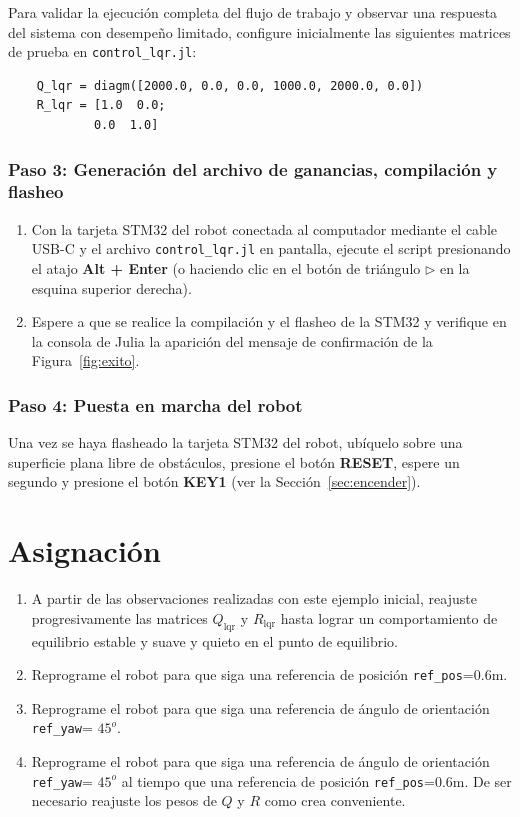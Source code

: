 Para validar la ejecución completa del flujo de trabajo y observar una respuesta del sistema con desempeño limitado, configure inicialmente las siguientes matrices de prueba en \texttt{control\_lqr.jl}:

\begin{verbatim}
	Q_lqr = diagm([2000.0, 0.0, 0.0, 1000.0, 2000.0, 0.0])
	R_lqr = [1.0  0.0;
			0.0  1.0]
\end{verbatim}

\subsubsection*{Paso 3: Generación del archivo de ganancias, compilación y flasheo}

\begin{enumerate}
	\item Con la tarjeta STM32 del robot conectada al computador mediante el cable USB-C y el archivo \texttt{control\_lqr.jl} en pantalla, ejecute el script presionando el atajo \textbf{Alt + Enter} (o haciendo clic en el botón de triángulo $\triangleright$ en la esquina superior derecha).
	\item Espere a que se realice la compilación y el flasheo de la STM32 y verifique en la consola de Julia la aparición del mensaje de confirmación de la Figura~\ref{fig:exito}.
\end{enumerate}

\subsubsection*{Paso 4: Puesta en marcha del robot}

Una vez se haya flasheado la tarjeta STM32 del robot, ubíquelo sobre una superficie plana libre de obstáculos, presione el botón \textbf{RESET}, espere un segundo y presione el botón \textbf{KEY1} (ver la Sección~\ref{sec:encender}).


\section{Asignación}
\begin{enumerate}
	\item A partir de las observaciones realizadas con este ejemplo inicial, reajuste progresivamente las matrices $Q_{\text{lqr}}$ y $R_{\text{lqr}}$ hasta lograr un comportamiento de equilibrio estable y suave y quieto en el punto de equilibrio.
	
	\item Reprograme el robot para que siga una referencia de posición \texttt{ref\_pos}=0.6m. 
	
	\item Reprograme el robot para que siga una referencia de ángulo de orientación  \texttt{ref\_yaw}= $45^o$.
	
	\item Reprograme el robot para que siga una referencia de ángulo de orientación  \texttt{ref\_yaw}= $45^o$ al tiempo que una referencia de posición \texttt{ref\_pos}=0.6m. De ser necesario reajuste los pesos de $Q$ y $R$ como crea conveniente.
\end{enumerate}


